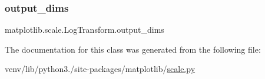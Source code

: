 \mbox{\label{classmatplotlib_1_1scale_1_1LogTransform_ac32c0aa1ac530200daeef3342291fe9a}} 
\subsubsection{\texorpdfstring{output\+\_\+dims}{output\_dims}}
{\footnotesize\ttfamily matplotlib.\+scale.\+Log\+Transform.\+output\+\_\+dims\hspace{0.3cm}{\ttfamily [static]}}



The documentation for this class was generated from the following file\+:\begin{DoxyCompactItemize}
\item 
venv/lib/python3./site-\/packages/matplotlib/\hyperlink{scale_8py}{scale.\+py}\end{DoxyCompactItemize}
